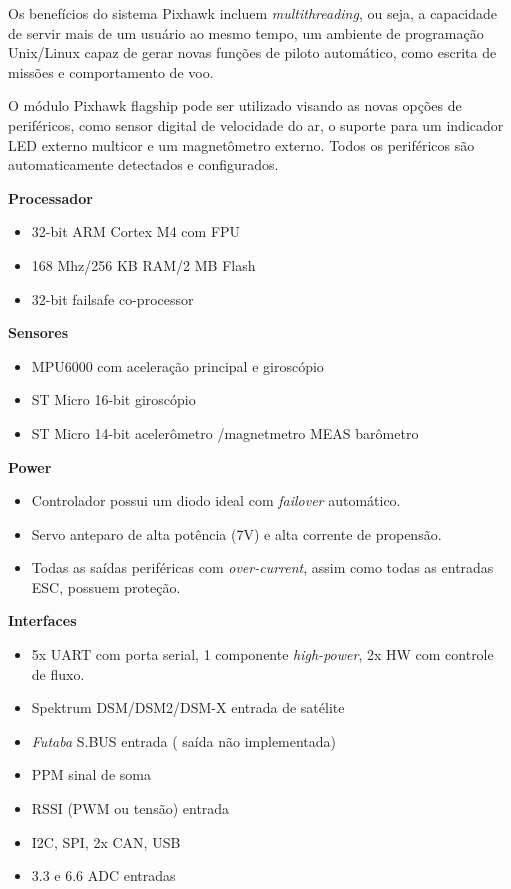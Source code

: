 Os benefícios do sistema Pixhawk incluem \textit{multithreading}, ou seja, a capacidade de servir mais de um usuário ao 
mesmo tempo, um ambiente de programação Unix/Linux capaz de gerar novas funções de piloto automático, como 
escrita de missões e comportamento de voo. \cite{pix}
 
O módulo Pixhawk flagship pode ser utilizado visando as novas opções de periféricos, como sensor digital de velocidade do ar, o suporte para um indicador LED externo multicor e um magnetômetro externo. Todos os periféricos são automaticamente detectados e configurados. \cite{pix}


\textbf{Processador}
\begin{itemize}
	\item 32-bit ARM Cortex M4 com FPU
	\item 168 Mhz/256 KB RAM/2 MB Flash 
	\item 32-bit failsafe co-processor
\end{itemize}

\textbf{Sensores}
\begin{itemize}
\item MPU6000 com aceleração principal e giroscópio
\item ST Micro 16-bit giroscópio
\item ST Micro 14-bit acelerômetro /magnetmetro  MEAS barômetro
\end{itemize}

\textbf{Power}
\begin{itemize}
\item Controlador possui um diodo ideal com \textit{failover} automático.
\item Servo anteparo de alta potência (7V) e alta corrente de propensão.
\item Todas as saídas periféricas com \textit{over-current}, assim como todas as entradas ESC, possuem proteção.
\end{itemize}

\textbf{Interfaces}
\begin{itemize}
\item 5x UART com porta serial, 1 componente \textit{high-power}, 2x HW com controle de fluxo.
\item Spektrum DSM/DSM2/DSM-X entrada de satélite
\item \textit{Futaba} S.BUS entrada ( saída não implementada)
\item PPM sinal de soma
\item RSSI (PWM ou tensão) entrada
\item I2C, SPI, 2x CAN, USB
\item 3.3 e 6.6 ADC entradas
\end{itemize}

